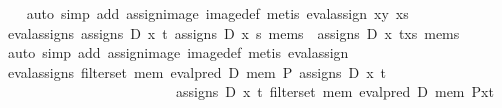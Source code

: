 \begin{isabellebody}
%
\isadelimproof
\ \ %
\endisadelimproof
%
\isatagproof
{}\isamarkupfalse%
\ {}auto\ simp\ add{}\ assign{}image\ image{}def{}\ {}metis\ eval{}assign{}\ xy\ xs{}{}{}%
\endisatagproof
{\isafoldproof}%
%
\isadelimproof
\isanewline
%
\endisadelimproof
\isanewline
{}\isamarkupfalse%
\ eval{}assigns{}{}\ {}assigns\ D\ x\ t\ {}assigns\ D\ x\ s\ mems{}\ {}\ assigns\ D\ x\ {}t{}x{}s{}{}\ mems{}\isanewline
%
\isadelimproof
\ \ %
\endisadelimproof
%
\isatagproof
{}\isamarkupfalse%
\ {}auto\ simp\ add{}\ assign{}image\ image{}def{}\ {}metis\ eval{}assign{}{}{}{}%
\endisatagproof
{\isafoldproof}%
%
\isadelimproof
\isanewline
%
\endisadelimproof
\isanewline
{}\isamarkupfalse%
\ eval{}assigns{}{}\ {}filter{}set\ {}{}mem{}\ eval{}pred\ D\ mem\ P{}\ {}assigns\ D\ x\ t\ {}{}\ {}\isanewline
\ \ \ \ \ \ \ \ \ \ \ \ \ \ \ \ \ \ \ \ \ \ \ \ \ assigns\ D\ x\ t\ {}filter{}set\ {}{}mem{}\ eval{}pred\ D\ mem\ {}P{}x{}t{}{}{}\ {}{}{}\isanewline

\end{isabellebody}
